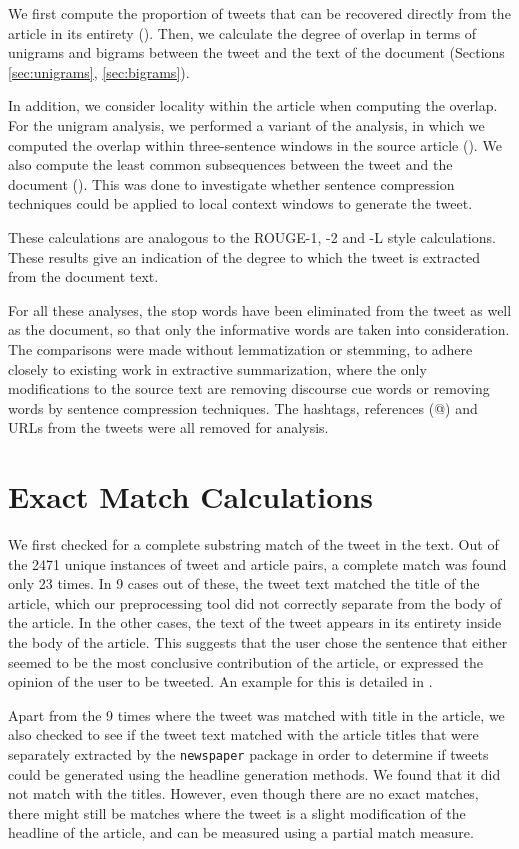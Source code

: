 We first compute the proportion of tweets that can be recovered directly from the article in its entirety (). Then, we calculate the degree of overlap in terms of unigrams and bigrams between the tweet and the text of the document (Sections \ref{sec:unigrams}, \ref{sec:bigrams}). 

In addition, we consider locality within the article when computing the overlap. For the unigram analysis, we performed a variant of the analysis, in which we computed the overlap within three-sentence windows in the source article (). We also compute the least common subsequences between the tweet and the document (). This was done to investigate whether sentence compression techniques could be applied to local context windows to generate the tweet.

These calculations are analogous to the ROUGE-1, -2 and -L style calculations. These results give an indication of the degree to which the tweet is extracted from the document text. 

For all these analyses, the stop words have been eliminated from the tweet as well as the document, so that only the informative words are taken into consideration. The comparisons were made without lemmatization or stemming, to adhere closely to existing work in extractive summarization, where the only modifications to the source text are removing discourse cue words or removing words by sentence compression techniques. The hashtags, references (@) and URLs from the tweets were all removed for analysis.

\section {Exact Match Calculations}
\label{sec:exact-match}
We first checked for a complete substring match of the tweet in the text. Out of the 2471 unique instances of tweet and article pairs, a complete match was found only 23 times. In 9 cases out of these, the tweet text matched the title of the article, which our preprocessing tool did not correctly separate from the body of the article. In the other cases, the text of the tweet appears in its entirety inside the body of the article. This suggests that the user chose the sentence that either seemed to be the most conclusive contribution of the article, or expressed the opinion of the user to be tweeted. An example for this is detailed in .

Apart from the 9 times where the tweet was matched with title in the article, we also checked to see if the tweet text matched with the article titles that were separately extracted by the \texttt{newspaper} package in order to determine if tweets could be generated using the headline generation methods. We found that it did not match with the titles. However, even though there are no exact matches, there might still be matches where the tweet is a slight modification of the headline of the article, and can be measured using a partial match measure.

